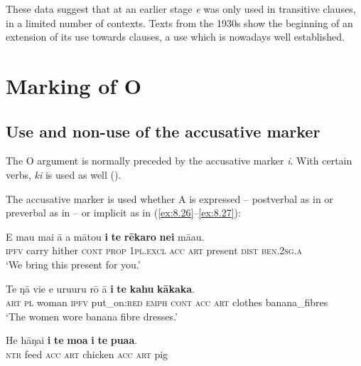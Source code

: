 {These data suggest that at an earlier stage \textit{e} was only used in transitive clauses, in a limited number of contexts. Texts from the 1930s show the beginning of an extension of its use towards  clauses, a use which is nowadays well established.

\section{Marking of O}\label{sec:8.4}
\subsection{Use and non-use of the accusative marker}\label{sec:8.4.1}
The O argument is normally preceded by the accusative marker \textit{i}. With certain verbs, \textit{ki} is used as well (). 

The accusative marker is used whether A is expressed – postverbal as in  or preverbal as in  – or implicit as in (\ref{ex:8.26}–\ref{ex:8.27}):

\ea\label{ex:8.24}
\gll E ma{\ꞌ}u mai {\ꞌ}ā a mātou \textbf{i} \textbf{te} \textbf{rēkaro} \textbf{nei} mā{\ꞌ}au.\\
\textsc{ipfv} carry hither \textsc{cont} \textsc{prop} \textsc{1pl.excl} \textsc{acc} \textsc{art} present \textsc{dist} \textsc{ben.2sg.a}\\

\glt 
‘We bring this present for you.’ \textstyleExampleref{[R210.127]} 
\z

\ea\label{ex:8.25}
\gll Te ŋā vi{\ꞌ}e e uruuru rō {\ꞌ}ā \textbf{i} \textbf{te} \textbf{kahu} \textbf{kākaka}.\\
\textsc{art} \textsc{pl} woman \textsc{ipfv} put\_on:\textsc{red} \textsc{emph} \textsc{cont} \textsc{acc} \textsc{art} clothes banana\_fibres\\

\glt 
‘The women wore banana fibre dresses.’ \textstyleExampleref{[R210.132]} 
\z

\ea\label{ex:8.26}
\gll He hāŋai \textbf{i} \textbf{te} \textbf{moa} \textbf{i} \textbf{te} \textbf{pua{\ꞌ}a}.\\
\textsc{ntr} feed \textsc{acc} \textsc{art} chicken \textsc{acc} \textsc{art} pig\\

}
